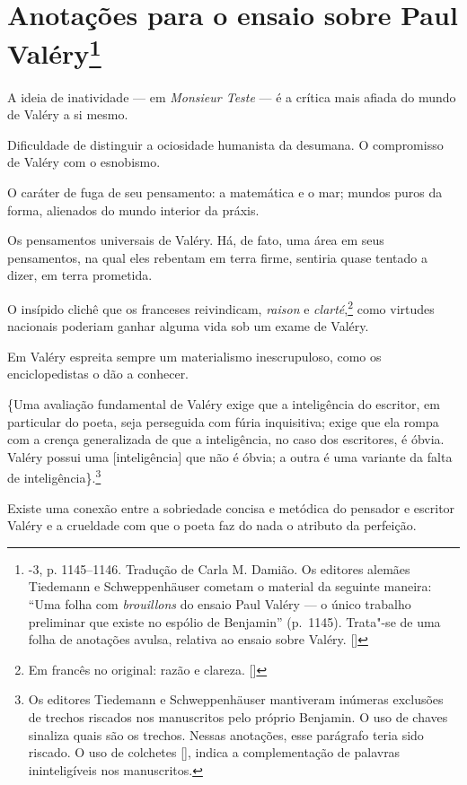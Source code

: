 
\chapter{Anotações para o ensaio sobre Paul Valéry\footnote[*]{-3, p. 1145--1146. Tradução de Carla M. Damião. Os
  editores alemães Tiedemann e Schweppenhäuser cometam o material da
  seguinte maneira: ``Uma folha com \emph{brouillons} do ensaio Paul
  Valéry --- o único trabalho preliminar que existe no espólio de
  Benjamin'' (p.~1145). Trata"-se de uma folha de anotações avulsa, relativa ao ensaio sobre Valéry. []}}

A ideia de inatividade --- em \emph{Monsieur Teste} --- é a crítica mais afiada do
mundo de Valéry a si mesmo.

Dificuldade de distinguir a ociosidade humanista da desumana. O
compromisso de Valéry com o esnobismo.

O caráter de fuga de seu pensamento: a matemática e o mar; mundos puros
da forma, alienados do mundo interior da práxis.

Os pensamentos universais de Valéry. Há, de fato, uma área em seus
pensamentos, na qual eles rebentam em terra firme, sentiria quase tentado
a dizer, em terra prometida.

O insípido clichê que os franceses reivindicam, \emph{raison} e
\emph{clarté},\footnote{Em francês no original: razão e clareza. []} como virtudes nacionais poderiam ganhar alguma vida
sob um exame de Valéry.

Em Valéry espreita sempre um materialismo inescrupuloso, como os
enciclopedistas o dão a conhecer.

\{Uma avaliação fundamental de Valéry exige que a inteligência do escritor,
em particular do poeta, seja perseguida com fúria inquisitiva; exige que
ela rompa com a crença generalizada de que a inteligência, no caso dos
escritores, é óbvia. Valéry possui uma {[}inteligência{]} que não é %
óbvia; a outra é uma variante da falta de inteligência\}.\footnote{Os editores Tiedemann e Schweppenhäuser mantiveram inúmeras
exclusões de trechos riscados nos manuscritos pelo próprio Benjamin. O uso de chaves {} sinaliza quais são os trechos. Nessas anotações, esse parágrafo teria sido riscado. O uso de colchetes [], indica a complementação de palavras ininteligíveis nos manuscritos.}

Existe uma conexão entre a sobriedade concisa e metódica do
pensador e escritor Valéry e a crueldade com que o poeta faz do nada o
atributo da perfeição.


